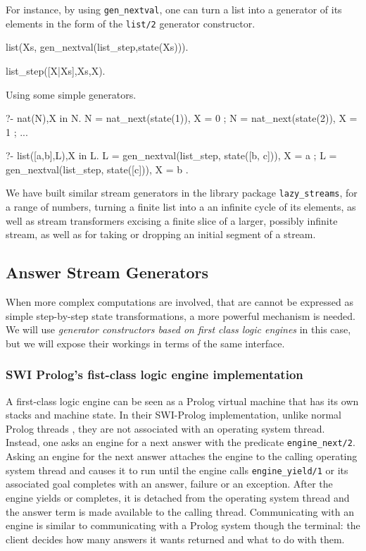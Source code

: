 \documentclass{new_tlp}
\begin{document}
For instance, by using {\tt gen\_nextval}, one can turn a list into a generator of its elements  in the form of the {\tt list/2} generator constructor.
\begin{code}
list(Xs, gen_nextval(list_step,state(Xs))).

list_step([X|Xs],Xs,X).
\end{code}

\BX
Using some simple generators.
\begin{codex}
?- nat(N),X in N.
N = nat_next(state(1)), X = 0 ;
N = nat_next(state(2)), X = 1 ;
...

?- list([a,b],L),X in L.
L = gen_nextval(list_step, state([b, c])), X = a ;
L = gen_nextval(list_step, state([c])), X = b .
\end{codex}
\EX

We have built similar stream generators in the library package 
{\tt lazy\_streams}, for a range of numbers, turning a finite list into
a an infinite cycle of its elements, as well as stream 
transformers excising a finite slice of a larger, possibly infinite stream,
as well as for taking or dropping an initial segment of a stream.

\subsection{Answer Stream Generators}

When more complex computations are involved, that are cannot be expressed as simple step-by-step state transformations, a more powerful mechanism is needed. We will use {\em generator constructors based on first class logic engines} in this case, but we will expose their workings in terms of the same interface.

\subsubsection{SWI Prolog's fist-class logic engine implementation}

A first-class logic engine \cite{tarau:cl2000,bp2011} can be seen as a Prolog virtual machine that has its own stacks and machine state. 
In their SWI-Prolog implementation, unlike normal Prolog threads \cite{swi,swi_threads}, they are not associated with an operating system thread. Instead, one asks an engine for a next answer with the predicate {\tt engine\_next/2}. Asking an engine for the next answer attaches the engine to the calling operating system thread and causes it to run until the engine calls {\tt engine\_yield/1} or its associated goal completes with an answer, failure or an exception. After the engine yields or completes, it is detached from the operating system thread and the answer term is made available to the calling thread. Communicating with an engine is similar to communicating with a Prolog system though the terminal: the client decides how many answers it wants returned and what to do with them.  
\end{document}
